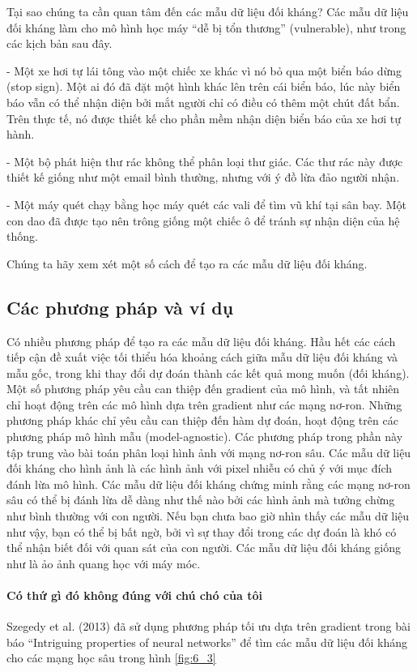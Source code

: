 Tại sao chúng ta cần quan tâm đến các mẫu dữ liệu đối kháng? Các mẫu dữ liệu đối kháng làm cho mô hình học máy ``dễ bị tổn thương'' (vulnerable), như trong các kịch bản sau đây.

- Một xe hơi tự lái tông vào một chiếc xe khác vì nó bỏ qua một biển báo dừng (stop sign). Một ai đó đã đặt một hình khác lên trên cái biển báo, lúc này biển báo vẫn có thể nhận diện bởi mắt người chỉ có điều có thêm một chút đất bẩn. Trên thực tế, nó được thiết kế cho phần mềm nhận diện biển báo của xe hơi tự hành.

- Một bộ phát hiện thư rác không thể phân loại thư giác. Các thư rác này được thiết kế giống như một email bình thường, nhưng với ý đồ lừa đảo người nhận.

- Một máy quét chạy bằng học máy quét các vali để tìm vũ khí tại sân bay. Một con dao đã được tạo nên trông giống một chiếc ô để tránh sự nhận diện của hệ thống.

Chúng ta hãy xem xét một số cách để tạo ra các mẫu dữ liệu đối kháng.

\subsection{Các phương pháp và ví dụ}

Có nhiều phương pháp để tạo ra các mẫu dữ liệu đối kháng. Hầu hết các cách tiếp cận đề xuất việc tối thiểu hóa khoảng cách giữa mẫu dữ liệu đối kháng và mẫu gốc, trong khi thay đổi dự đoán thành các kết quả mong muốn (đối kháng). Một số phương pháp yêu cầu can thiệp đến gradient của mô hình, và tất nhiên chỉ hoạt động trên các mô hình dựa trên gradient như các mạng nơ-ron. Những phương pháp khác chỉ yêu cầu can thiệp đến hàm dự đoán, hoạt động trên các phương pháp mô hình mẫu (model-agnostic). Các phương pháp trong phần này tập trung vào bài toán phân loại hình ảnh với mạng nơ-ron sâu. Các mẫu dữ liệu đối kháng cho hình ảnh là các hình ảnh với pixel nhiễu có chủ ý với mục đích đánh lừa mô hình. Các mẫu dữ liệu đối kháng chứng minh rằng các mạng nơ-ron sâu có thể bị đánh lừa dễ dàng như thế nào bởi các hình ảnh mà tưởng chừng như bình thường với con người. Nếu bạn chưa bao giờ nhìn thấy các mẫu dữ liệu như vậy, bạn có thể bị bất ngờ, bởi vì sự thay đổi trong các dự đoán là khó có thể nhận biết đối với quan sát của con người. Các mẫu dữ liệu đối kháng giống như là ảo ảnh quang học với máy móc.

\paragraph{Có thứ gì đó không đúng với chú chó của tôi}
Szegedy et al. (2013) đã sử dụng phương pháp tối ưu dựa trên gradient trong bài báo ``Intriguing properties of neural networks'' để tìm các mẫu dữ liệu đối kháng cho các mạng học sâu trong hình \ref{fig:6_3}

